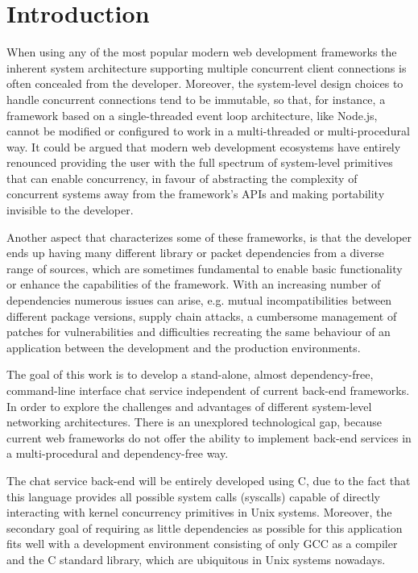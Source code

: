 \section{Introduction}
When using any of the most popular modern web development frameworks the inherent system architecture supporting multiple concurrent client connections is often concealed from the developer. Moreover, the system-level design choices to handle concurrent connections tend to be immutable, so that, for instance, a framework based on a single-threaded event loop architecture, like Node.js, cannot be modified or configured to work in a multi-threaded or multi-procedural way. It could be argued that modern web development ecosystems have entirely renounced providing the user with the full spectrum of system-level primitives that can enable concurrency, in favour of abstracting the complexity of concurrent systems away from the framework's APIs and making portability invisible to the developer.

Another aspect that characterizes some of these frameworks, is that the developer ends up having many different library or packet dependencies from a diverse range of sources, which are sometimes fundamental to enable basic functionality or enhance the capabilities of the framework. With an increasing number of dependencies numerous issues can arise, e.g. mutual incompatibilities between different package versions, supply chain attacks, a cumbersome management of patches for vulnerabilities and difficulties recreating the same behaviour of an application between the development and the production environments. 

The goal of this work is to develop a stand-alone, almost dependency-free, command-line interface chat service independent of current back-end frameworks. In order to explore the challenges and advantages of different system-level networking architectures. There is an unexplored technological gap, because current web frameworks do not offer the ability to implement back-end services in a multi-procedural and dependency-free way. 

The chat service back-end will be entirely developed using C, due to the fact that this language provides all possible system calls (syscalls) capable of directly interacting with kernel concurrency primitives in Unix systems. Moreover, the secondary goal of requiring as little dependencies as possible for this application fits well with a development environment consisting of only GCC as a compiler and the C standard library, which are ubiquitous in Unix systems nowadays. 

